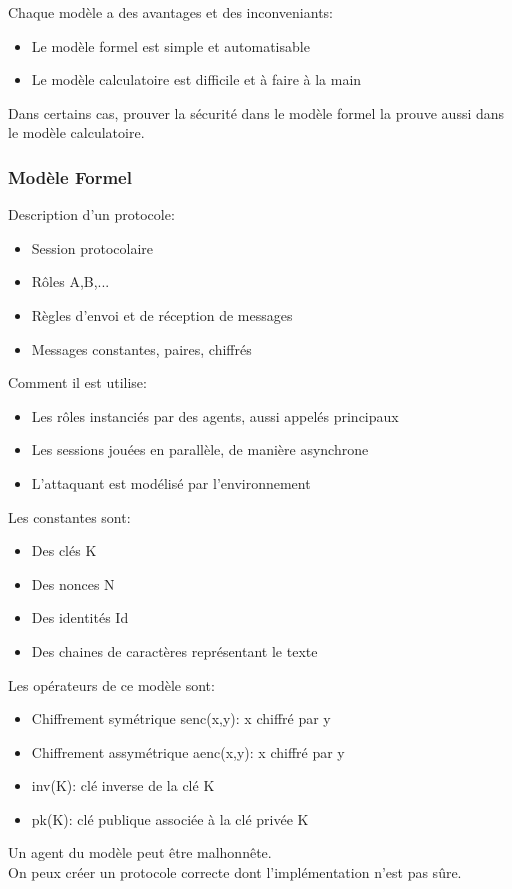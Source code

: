 Chaque modèle a des avantages et des inconveniants:
\begin{itemize}
	\item Le modèle formel est simple et automatisable
	\item Le modèle calculatoire est difficile et à faire à la main
\end{itemize}
Dans certains cas, prouver la sécurité dans le modèle formel la prouve aussi dans le modèle calculatoire.

\subsubsection{Modèle Formel}
Description d'un protocole:
\begin{itemize}
	\item Session protocolaire
	\item Rôles A,B,...
	\item Règles d'envoi et de réception de messages
	\item Messages constantes, paires, chiffrés
\end{itemize}
Comment il est utilise:
\begin{itemize}
	\item Les rôles instanciés par des agents, aussi appelés principaux
	\item Les sessions jouées en parallèle, de manière asynchrone
	\item L'attaquant est modélisé par l'environnement
\end{itemize}

Les constantes sont:
\begin{itemize}
	\item Des clés K
	\item Des nonces N
	\item Des identités Id
	\item Des chaines de caractères représentant le texte
\end{itemize}

Les opérateurs de ce modèle sont:
\begin{itemize}
	\item Chiffrement symétrique senc(x,y): x chiffré par y
	\item Chiffrement assymétrique aenc(x,y): x chiffré par y
	\item inv(K): clé inverse de la clé K
	\item pk(K): clé publique associée à la clé privée K
\end{itemize}
Un agent du modèle peut être malhonnête.\\
On peux créer un protocole correcte dont l'implémentation n'est pas sûre.

